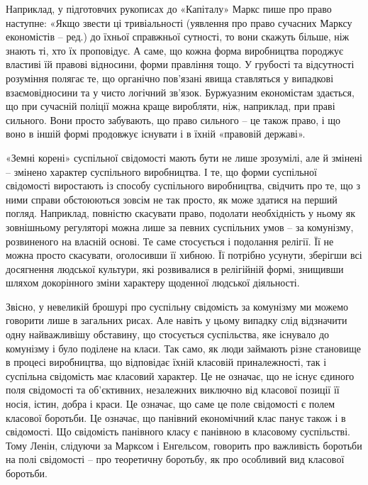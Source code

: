 \documentclass[../main]{subfiles}
\begin{document}
Наприклад, у підготовчих рукописах до «Капіталу» Маркс пише про право наступне: «Якщо звести ці тривіальності (уявлення про право сучасних Марксу економістів – ред.) до їхньої справжньої сутності, то вони скажуть більше, ніж знають ті, хто їх проповідує. А саме, що кожна форма виробництва породжує властиві їй правові відносини, форми правління тощо. У грубості та відсутності розуміння полягає те, що органічно пов’язані явища ставляться у випадкові взаємовідносини та у чисто логічний зв’язок. Буржуазним економістам здається, що при сучасній поліції можна краще виробляти, ніж, наприклад, при праві сильного. Вони просто забувають, що право сильного – це також право, і що воно в іншій формі продовжує існувати і в їхній «правовій державі».

«Земні корені» суспільної свідомості мають бути не лише зрозумілі, але й змінені – змінено характер суспільного виробництва. І те, що форми суспільної свідомості виростають із способу суспільного виробництва, свідчить про те, що з ними справи обстоюються зовсім не так просто, як може здатися на перший погляд. Наприклад, повністю скасувати право, подолати необхідність у ньому як зовнішньому регуляторі можна лише за певних суспільних умов – за комунізму, розвиненого на власній основі. Те саме стосується і подолання релігії. Її не можна просто скасувати, оголосивши її хибною. Її потрібно усунути, зберігши всі досягнення людської культури, які розвивалися в релігійній формі, знищивши шляхом докорінного зміни характеру щоденної людської діяльності.

Звісно, у невеликій брошурі про суспільну свідомість за комунізму ми можемо говорити лише в загальних рисах. Але навіть у цьому випадку слід відзначити одну найважливішу обставину, що стосується суспільства, яке існувало до комунізму і було поділене на класи. Так само, як люди займають різне становище в процесі виробництва, що відповідає їхній класовій приналежності, так і суспільна свідомість має класовий характер. Це не означає, що не існує єдиного поля свідомості та об’єктивних, незалежних виключно від класової позиції її носія, істин, добра і краси. Це означає, що саме це поле свідомості є полем класової боротьби. Це означає, що панівний економічний клас панує також і в свідомості. Що свідомість панівного класу є панівною в класовому суспільстві. Тому Ленін, слідуючи за Марксом і Енгельсом, говорить про важливість боротьби на полі свідомості – про теоретичну боротьбу, як про особливий вид класової боротьби.
\end{document}
